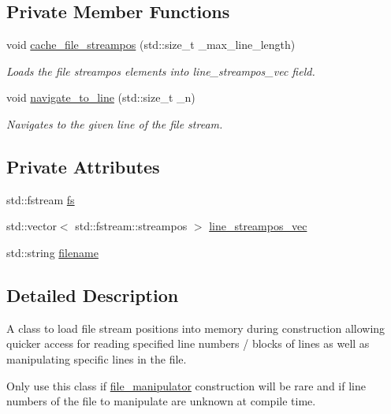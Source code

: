 \subsection*{Private Member Functions}
\begin{DoxyCompactItemize}
\item 
void \hyperlink{classcrsc_1_1file__manipulator_acf32d5eb961a51d8ce89e74010191132}{cache\+\_\+file\+\_\+streampos} (std\+::size\+\_\+t \+\_\+max\+\_\+line\+\_\+length)
\begin{DoxyCompactList}\small\item\em Loads the file streampos elements into line\+\_\+streampos\+\_\+vec field. \end{DoxyCompactList}\item 
void \hyperlink{classcrsc_1_1file__manipulator_afea488b461ee458f3390094d6b95d5ac}{navigate\+\_\+to\+\_\+line} (std\+::size\+\_\+t \+\_\+n)
\begin{DoxyCompactList}\small\item\em Navigates to the given line of the file stream. \end{DoxyCompactList}\end{DoxyCompactItemize}
\subsection*{Private Attributes}
\begin{DoxyCompactItemize}
\item 
std\+::fstream \hyperlink{classcrsc_1_1file__manipulator_a167ab2d18c75238450ab7496a38bbfe0}{fs}
\item 
std\+::vector$<$ std\+::fstream\+::streampos $>$ \hyperlink{classcrsc_1_1file__manipulator_ad856f2baab967b657f9a10003179e8c5}{line\+\_\+streampos\+\_\+vec}
\item 
std\+::string \hyperlink{classcrsc_1_1file__manipulator_a3b8ec12bff89aa76b3908c0081056076}{filename}
\end{DoxyCompactItemize}


\subsection{Detailed Description}
A class to load file stream positions into memory during construction allowing quicker access for reading specified line numbers / blocks of lines as well as manipulating specific lines in the file. 

Only use this class if \hyperlink{classcrsc_1_1file__manipulator}{file\+\_\+manipulator} construction will be rare and if line numbers of the file to manipulate are unknown at compile time. 

